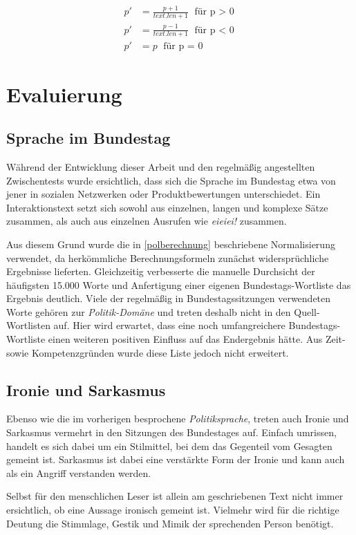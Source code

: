 \begin{align}
p' &= \frac{ p + 1 }{ text.len + 1 } \text{ für p $>$ 0}\\
p' &= \frac{ p - 1 }{ text.len + 1 } \text{ für p $<$ 0}\\
p' &= p \text{ für p $=$ 0}
\end{align}

\section{Evaluierung}
\subsection{Sprache im Bundestag}
\label{sprachebundestag}
Während der Entwicklung dieser Arbeit und den regelmäßig angestellten Zwischentests wurde ersichtlich, dass sich die Sprache im Bundestag etwa von jener in sozialen Netzwerken oder Produktbewertungen unterschiedet. 
Ein Interaktionstext setzt sich sowohl aus einzelnen, langen und komplexe Sätze zusammen, als auch aus einzelnen Ausrufen wie \textit{\glqq eieiei!\grqq} zusammen. 

Aus diesem Grund wurde die in \ref{polberechnung} beschriebene Normalisierung verwendet, da herkömmliche Berechnungsformeln zunächst widersprüchliche Ergebnisse lieferten. 
Gleichzeitig verbesserte die manuelle Durchsicht der häufigsten 15.000 Worte und Anfertigung einer eigenen Bundestags-Wortliste das Ergebnis deutlich. 
Viele der regelmäßig in Bundestagssitzungen verwendeten Worte gehören zur \textit{Politik-Domäne} und treten deshalb nicht in den Quell-Wortlisten auf. 
Hier wird erwartet, dass eine noch umfangreichere Bundestags-Wortliste einen weiteren positiven Einfluss auf das Endergebnis hätte. 
Aus Zeit- sowie Kompetenzgründen wurde diese Liste jedoch nicht erweitert. 

\subsection{Ironie und Sarkasmus}
Ebenso wie die im vorherigen besprochene \textit{Politiksprache}, treten auch Ironie und Sarkasmus vermehrt in den Sitzungen des Bundestages auf. 
Einfach umrissen, handelt es sich dabei um ein Stilmittel, bei dem das Gegenteil vom Gesagten gemeint ist. 
Sarkasmus ist dabei eine verstärkte Form der Ironie und kann auch als ein Angriff verstanden werden. 

Selbst für den menschlichen Leser ist allein am geschriebenen Text nicht immer ersichtlich, ob eine Aussage ironisch gemeint ist. 
Vielmehr wird für die richtige Deutung die Stimmlage, Gestik und Mimik der sprechenden Person benötigt. 


